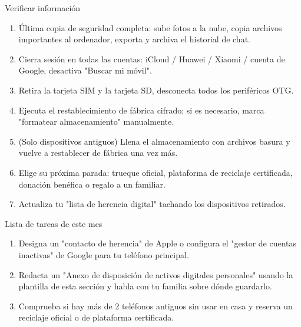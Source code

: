 \begin{tcbpractice}{Verificar información}
\begin{enumerate}
  \item Última copia de seguridad completa: sube fotos a la nube, copia archivos importantes al ordenador, exporta y archiva el historial de chat.
  \item Cierra sesión en todas las cuentas: iCloud / Huawei / Xiaomi / cuenta de Google, desactiva "Buscar mi móvil".
  \item Retira la tarjeta SIM y la tarjeta SD, desconecta todos los periféricos OTG.
  \item Ejecuta el restablecimiento de fábrica cifrado; si es necesario, marca "formatear almacenamiento" manualmente.
  \item (Solo dispositivos antiguos) Llena el almacenamiento con archivos basura y vuelve a restablecer de fábrica una vez más.
  \item Elige su próxima parada: trueque oficial, plataforma de reciclaje certificada, donación benéfica o regalo a un familiar.
  \item Actualiza tu "lista de herencia digital" tachando los dispositivos retirados.
\end{enumerate}

\end{tcbpractice}

\begin{tcbpractice}{Lista de tareas de este mes}
\begin{enumerate}
  \item Designa un "contacto de herencia" de Apple o configura el "gestor de cuentas inactivas" de Google para tu teléfono principal.
  \item Redacta un "Anexo de disposición de activos digitales personales" usando la plantilla de esta sección y habla con tu familia sobre dónde guardarlo.
  \item Comprueba si hay más de 2 teléfonos antiguos sin usar en casa y reserva un reciclaje oficial o de plataforma certificada.
\end{enumerate}

\end{tcbpractice}
